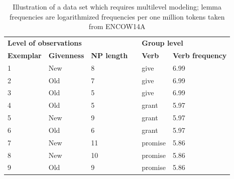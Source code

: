 \documentclass[a4paper,12pt]{article}
\begin{document}
\begin{table}
  \centering
  \begin{tabular}{lllp{0.5cm}ll}
    \toprule
    \multicolumn{3}{l}{\textbf{Level of observations}}    && \multicolumn{2}{l}{\textbf{Group level}} \\
    \textbf{Exemplar} & \textbf{Givenness} & \textbf{NP length} && \textbf{Verb} & \textbf{Verb frequency} \\
    \midrule
            1 &     New   &      8    &&    give   &   6.99    \\
            2 &     Old   &      7    &&    give   &   6.99    \\
            3 &     Old   &      5    &&    give   &   6.99    \\
            4 &     Old   &      5    &&    grant  &   5.97    \\
            5 &     New   &      9    &&    grant  &   5.97    \\
            6 &     Old   &      6    &&    grant  &   5.97    \\
            7 &     New   &      11   &&   promise &   5.86    \\
            8 &     New   &      10   &&   promise &   5.86    \\
            9 &     Old   &      9    &&   promise &   5.86    \\
    \bottomrule
  \end{tabular}
  \caption{Illustration of a data set which requires multilevel modeling; lemma frequencies are logarithmized frequencies per one million tokens taken from ENCOW14A}
  \label{tab:multilevel}
\end{table}
\end{document}
